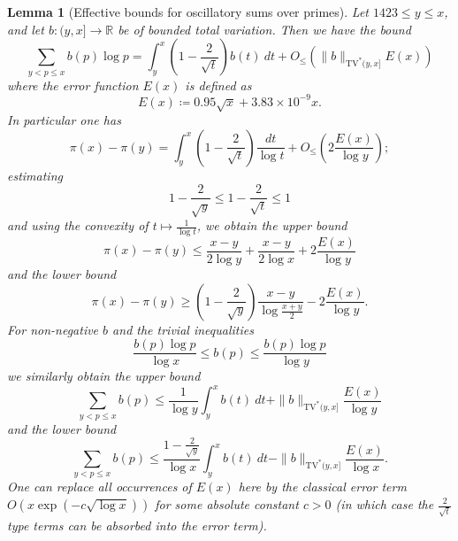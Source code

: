 \documentclass[12pt,a4paper,reqno]{amsart}
\numberwithin{equation}{section}
\theoremstyle{plain}
\newtheorem{lemma}[theorem]{Lemma}
\theoremstyle{definition}
\newcommand\R{\mathbb{R}}
\begin{document}
\begin{lemma}[Effective bounds for oscillatory sums over primes]\label{osc-lemma}  Let $1423 \leq y \leq x$, and let $b: (y,x] \to \R$ be of bounded total variation.  Then we have the bound
\begin{equation}\label{bv-exact}
    \sum_{y < p \leq x} b(p) \log p = \int_y^x \left(1-\frac{2}{\sqrt{t}}\right) b(t)\ dt + O_{\leq}(\|b\|_{\mathrm{TV}^*(y,x]} E(x))
\end{equation}
where the error function $E(x)$ is defined as
\begin{equation}\label{tilde-e}
  E(x) \coloneqq 0.95 \sqrt{x} + 3.83 \times 10^{-9} x.
\end{equation}
In particular one has
\begin{equation}\label{pix}
  \pi(x) - \pi(y) = \int_y^x \left(1-\frac{2}{\sqrt{t}}\right)\frac{dt}{\log t} + O_\leq\left(2 \frac{E(x)}{\log y}\right);
\end{equation}
estimating
$$ 1-\frac{2}{\sqrt{y}} \leq 1-\frac{2}{\sqrt{t}} \leq 1$$
and using the convexity of $t \mapsto \frac{1}{\log t}$, we obtain the upper bound
\begin{equation}\label{pixy-upper}
 \pi(x) - \pi(y) \leq \frac{x-y}{2\log y} + \frac{x-y}{2\log x} + 2 \frac{E(x)}{\log y}
\end{equation}
and the lower bound
\begin{equation}\label{pixy-lower}
  \pi(x) - \pi(y) \geq \left(1-\frac{2}{\sqrt{y}}\right) \frac{x-y}{\log \frac{x+y}{2}} - 2 \frac{E(x)}{\log y}.
\end{equation}
For non-negative $b$ and the trivial inequalities
$$ \frac{b(p) \log p}{\log x}  \leq b(p) \leq \frac{b(p) \log p}{\log y} $$
we similarly obtain the upper bound
\begin{equation}\label{bv-upper}
   \sum_{y < p \leq x} b(p) \leq \frac{1}{\log y} \int_y^x b(t)\ dt + \|b\|_{\mathrm{TV}^*(y,x]} \frac{E(x)}{\log y}
\end{equation}
and the lower bound
\begin{equation}\label{bv-lower}
  \sum_{y < p \leq x} b(p) \leq \frac{1-\frac{2}{\sqrt{y}}}{\log x} \int_y^x b(t)\ dt - \|b\|_{\mathrm{TV}^*(y,x]} \frac{E(x)}{\log x}.
\end{equation}
One can replace all occurrences of $E(x)$ here by the classical error term $O(x \exp(-c \sqrt{\log x}))$ for some absolute constant $c>0$ (in which case the $\frac{2}{\sqrt{t}}$ type terms can be absorbed into the error term).
\end{lemma}
\end{document}
